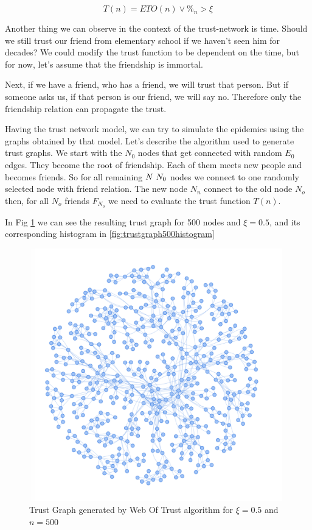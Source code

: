 \begin{equation}
T(n) = ETO(n) \lor \%_n > \xi
\end{equation}

Another thing we can observe in the context of the trust-network is time. Should we still trust our friend from elementary school if we haven't seen him for decades? We could modify the trust function to be dependent on the time, but for now, let's assume that the friendship is immortal.

Next, if we have a friend, who has a friend, we will trust that person. But if someone asks us, if that person is our friend, we will say no. Therefore only the friendship relation can propagate the trust.

Having the trust network model, we can try to simulate the epidemics using the graphs obtained by that model. Let's describe the algorithm used to generate trust graphs.
We start with the $N_0$ nodes that get connected with random $E_0$ edges. They become the root of friendship. Each of them meets new people and becomes friends. So for all remaining $N \\\ N_0$ nodes we connect to one randomly selected node with friend relation. The new node $N_n$ connect to the old node $N_o$ then, for all $N_o$ friends $F_{N_o}$ we need to evaluate the trust function $T(n)$.

In Fig \ref{fig:trustgraph500} we can see the resulting trust graph for 500 nodes and $\xi = 0.5$, and its corresponding histogram in \ref{fig:trustgraph500histogram}

\begin{figure}[h!]
    \includegraphics[width=11cm]{img/webOfTrust500Graph.png}
    \centering
    \caption{Trust Graph generated by Web Of Trust algorithm for $\xi=0.5$ and $n = 500$}
    \label{fig:trustgraph500}
\end{figure}

